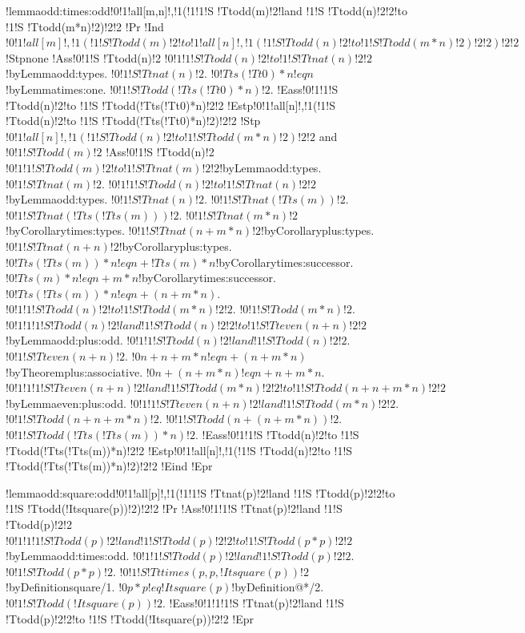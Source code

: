!lemma{odd:times:odd}{!0!1!all[m,n]!,!1(!1!1!S !Tt{odd}(m)!2!land !1!S !Tt{odd}(n)!2!2!to !1!S !Tt{odd}(m*n)!2)!2!2}
!Pr{
!Ind{$!0!1!all[m]!,!1(!1!S !Tt{odd}(m)!2!to !1!all[n]!,!1(!1!S !Tt{odd}(n)!2!to !1!S !Tt{odd}(m*n)!2)!2!2)!2!2$}
!Stp{none}
!Ass{!0!1!S !Tt{odd}(n)!2}
$!0!1!1!S !Tt{odd}(n)!2!to !1!S !Tt{nat}(n)!2!2$!by{Lemma}{odd:types}.
$!0!1!S !Tt{nat}(n)!2$.
$!0!Tt{s}(!Tt{0})*n !eq n$!by{Lemma}{times:one}.
$!0!1!S !Tt{odd}(!Tt{s}(!Tt{0})*n)!2$.
!Eass{!0!1!1!S !Tt{odd}(n)!2!to !1!S !Tt{odd}(!Tt{s}(!Tt{0})*n)!2!2}
!Estp{!0!1!all[n]!,!1(!1!S !Tt{odd}(n)!2!to !1!S !Tt{odd}(!Tt{s}(!Tt{0})*n)!2)!2!2}
!Stp{$!0!1!all[n]!,!1(!1!S !Tt{odd}(n)!2!to !1!S !Tt{odd}(m*n)!2)!2!2$ and $!0!1!S !Tt{odd}(m)!2$}
!Ass{!0!1!S !Tt{odd}(n)!2}
$!0!1!1!S !Tt{odd}(m)!2!to !1!S !Tt{nat}(m)!2!2$!by{Lemma}{odd:types}.
$!0!1!S !Tt{nat}(m)!2$.
$!0!1!1!S !Tt{odd}(n)!2!to !1!S !Tt{nat}(n)!2!2$!by{Lemma}{odd:types}.
$!0!1!S !Tt{nat}(n)!2$.
$!0!1!S !Tt{nat}(!Tt{s}(m))!2$.
$!0!1!S !Tt{nat}(!Tt{s}(!Tt{s}(m)))!2$.
$!0!1!S !Tt{nat}(m*n)!2$!by{Corollary}{times:types}.
$!0!1!S !Tt{nat}(n+m*n)!2$!by{Corollary}{plus:types}.
$!0!1!S !Tt{nat}(n+n)!2$!by{Corollary}{plus:types}.
$!0!Tt{s}(!Tt{s}(m))*n !eq n+!Tt{s}(m)*n$!by{Corollary}{times:successor}.
$!0!Tt{s}(m)*n !eq n+m*n$!by{Corollary}{times:successor}.
$!0!Tt{s}(!Tt{s}(m))*n !eq n+(n+m*n)$.
$!0!1!1!S !Tt{odd}(n)!2!to !1!S !Tt{odd}(m*n)!2!2$.
$!0!1!S !Tt{odd}(m*n)!2$.
$!0!1!1!1!S !Tt{odd}(n)!2!land !1!S !Tt{odd}(n)!2!2!to !1!S !Tt{even}(n+n)!2!2$!by{Lemma}{odd:plus:odd}.
$!0!1!1!S !Tt{odd}(n)!2!land !1!S !Tt{odd}(n)!2!2$.
$!0!1!S !Tt{even}(n+n)!2$.
$!0n+n+m*n !eq n+(n+m*n)$!by{Theorem}{plus:associative}.
$!0n+(n+m*n) !eq n+n+m*n$.
$!0!1!1!1!S !Tt{even}(n+n)!2!land !1!S !Tt{odd}(m*n)!2!2!to !1!S !Tt{odd}(n+n+m*n)!2!2$!by{Lemma}{even:plus:odd}.
$!0!1!1!S !Tt{even}(n+n)!2!land !1!S !Tt{odd}(m*n)!2!2$.
$!0!1!S !Tt{odd}(n+n+m*n)!2$.
$!0!1!S !Tt{odd}(n+(n+m*n))!2$.
$!0!1!S !Tt{odd}(!Tt{s}(!Tt{s}(m))*n)!2$.
!Eass{!0!1!1!S !Tt{odd}(n)!2!to !1!S !Tt{odd}(!Tt{s}(!Tt{s}(m))*n)!2!2}
!Estp{!0!1!all[n]!,!1(!1!S !Tt{odd}(n)!2!to !1!S !Tt{odd}(!Tt{s}(!Tt{s}(m))*n)!2)!2!2}
!Eind}
!Epr

!lemma{odd:square:odd}{!0!1!all[p]!,!1(!1!1!S !Tt{nat}(p)!2!land !1!S !Tt{odd}(p)!2!2!to !1!S !Tt{odd}(!It{square}(p))!2)!2!2}
!Pr{
!Ass{!0!1!1!S !Tt{nat}(p)!2!land !1!S !Tt{odd}(p)!2!2}
$!0!1!1!1!S !Tt{odd}(p)!2!land !1!S !Tt{odd}(p)!2!2!to !1!S !Tt{odd}(p*p)!2!2$!by{Lemma}{odd:times:odd}.
$!0!1!1!S !Tt{odd}(p)!2!land !1!S !Tt{odd}(p)!2!2$.
$!0!1!S !Tt{odd}(p*p)!2$.
$!0!1!S !Tt{times}(p,p,!It{square}(p))!2$!by{Definition}{square/1}.
$!0p*p !eq !It{square}(p)$!by{Definition}{@*/2}.
$!0!1!S !Tt{odd}(!It{square}(p))!2$.
!Eass{!0!1!1!1!S !Tt{nat}(p)!2!land !1!S !Tt{odd}(p)!2!2!to !1!S !Tt{odd}(!It{square}(p))!2!2}}
!Epr

